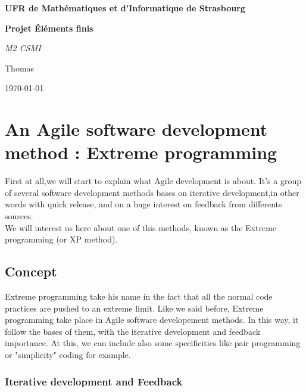 \documentclass[french,english,12pt]{article}
\begin{document}
\begin{titlepage}
\begin{center}
  \Huge
  \textbf{UFR de Mathématiques et d'Informatique de Strasbourg}
  \par \vspace{2 cm}
  \textbf{Projet Éléments finis}
  \par \vspace{1 cm}
  \emph{M2 CSMI}
  \par \vspace{5 cm}
   Thomas
  \par \vspace{3 cm}
  \normalsize{\today}\\
  \end{center}
\end{titlepage}

\newpage
\tableofcontents
\newpage

\section{An Agile software development method : Extreme programming }

First at all,we will start to explain what Agile development is about. It's a group of several software development methods bases on iterative development,in other words with quick release, and on a huge interest on feedback from differents sources.\\
We will interest us here about one of this methods, known as the Extreme programming (or XP method).\\

\subsection{Concept}

Extreme programming take his name in the fact that all the normal code practices are pushed to an extreme limit. Like we said before, Extreme programming take place in Agile software developement methods. In this way, it follow the bases of them, with the iterative development and feedback importance. At this, we can include also some specificities like pair programming or "simplicity" coding for example.

\subsubsection{Iterative development and Feedback}
\end{document}
